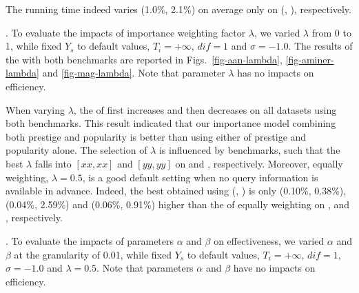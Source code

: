 The running time indeed varies (1.0\%, 2.1\%) on average only on (\aminer, \magdata), respectively.



.
To evaluate the impacts of importance weighting factor $\lambda$, we varied $\lambda$ from 0 to 1, while fixed $Y_s$ to default values, $T_i=+\infty$, $dif=1$ and $\sigma=-1.0$. The results of the \PairAcc with both benchmarks are reported in Figs.~\ref{fig-aan-lambda}, \ref{fig-aminer-lambda} and \ref{fig-mag-lambda}. Note that parameter $\lambda$ has no impacts on efficiency.

When varying $\lambda$, the \PairAcc of \ensemblerank first increases and then decreases on all datasets using both benchmarks. This result indicated that our importance model combining both prestige and popularity is better than using either of prestige and popularity alone. The selection of $\lambda$ is influenced by benchmarks, such that the best $\lambda$ falls into $[xx,xx]$ and $[yy,yy]$ on \fcita and \recom, respectively. Moreover, equally weighting, \ie $\lambda=0.5$, is a good default setting when no query information is available in advance.
Indeed, the best obtained \PairAcc using (\fcita, \recom) is only (0.10\%, 0.38\%), (0.04\%, 2.59\%) and (0.06\%, 0.91\%)  higher than the \PairAcc of equally weighting on \aan, \aminer and \magdata, respectively.


.
To evaluate the impacts of parameters $\alpha$ and $\beta$ on effectiveness, we varied $\alpha$ and $\beta$ at the granularity of 0.01, while fixed $Y_s$ to default values, $T_i=+\infty$, $dif=1$, $\sigma=-1.0$ and $\lambda=0.5$. Note that parameters $\alpha$ and $\beta$ have no impacts on efficiency.



